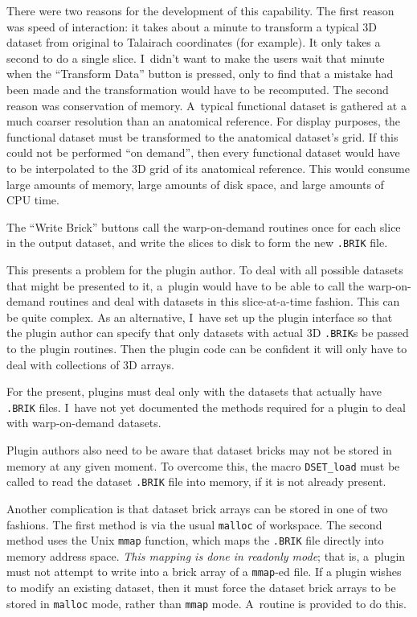     There were two reasons for the development of this
    capability.  The first reason was speed of interaction:  it takes
    about a minute to transform a typical 3D dataset from original
    to Talairach coordinates (for example).  It only takes a second
    to do a single slice.  I~didn't want to make the users wait
    that minute when the ``Transform Data'' button is pressed,
    only to find that a mistake had been made and the transformation
    would have to be recomputed.  The second reason was conservation
    of memory.  A~typical functional dataset is gathered at a much
    coarser resolution than an anatomical reference.  For display
    purposes, the functional dataset must be transformed to the
    anatomical dataset's grid.  If this could not be performed
    ``on demand'', then every functional dataset would have to
    be interpolated to the 3D grid of its anatomical reference.
    This would consume large amounts of memory, large amounts
    of disk space, and large amounts of CPU time.

    The \afnit ``Write Brick'' buttons call the warp-on-demand routines
    once for each slice in the output dataset, and write the
    slices to disk to form the new {\tt .BRIK} file.

    This presents a problem for the plugin author.  To deal with
    all possible datasets that might be presented to it, a~plugin
    would have to be able to call the warp-on-demand routines and
    deal with datasets in this slice-at-a-time fashion.  This can be
    quite complex.  As an alternative, I~have set up the plugin interface
    so that the plugin author can specify that only datasets with
    actual 3D {\tt .BRIK}s be passed to the plugin routines.
    Then the plugin code can be confident it will only have to
    deal with collections of 3D arrays.

    For the present,\seeme{\blob}
    plugins must deal only with the datasets that actually
    have {\tt .BRIK} files.  I~have not yet
    documented the methods required for a plugin to deal with
    warp-on-demand datasets.

    Plugin authors also need to be aware that dataset bricks may not
    be stored in memory at any given moment.  To overcome this,
    the macro {\tt DSET\_load} must be called to read the dataset
    {\tt .BRIK} file into memory, if it is not already present.

    Another complication is that dataset brick arrays can be stored
    in one of two fashions.  The first method is via the usual {\tt malloc}
    of workspace.  The second method uses the Unix {\tt mmap} function,
    which maps the {\tt .BRIK} file directly into memory address space.
    {\it This mapping is done in readonly mode}; that is, a~plugin
    must not attempt to write into a brick array of a {\tt mmap}-ed file.
    If a plugin wishes to modify an existing dataset, then it must
    force the dataset brick arrays to be stored in {\tt malloc} mode,
    rather than {\tt mmap} mode.  A~routine is provided to do this.

